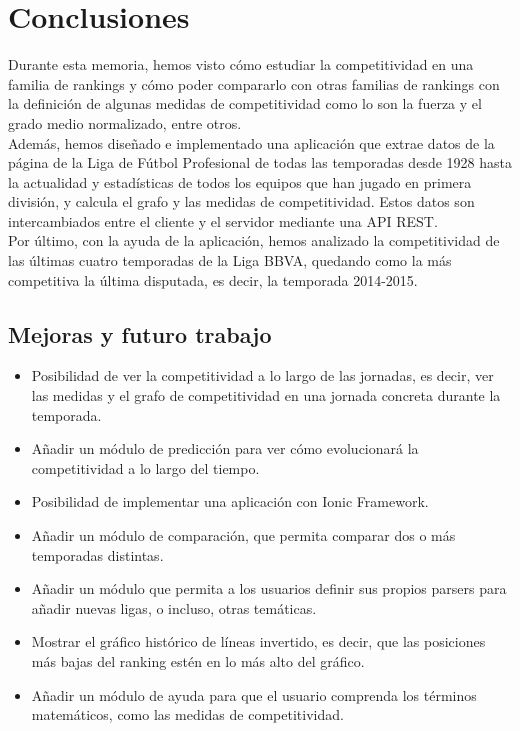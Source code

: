 \chapter{Conclusiones}

Durante esta memoria, hemos visto cómo estudiar la competitividad en una familia de rankings y cómo poder compararlo con otras familias de rankings con la definición de algunas medidas de competitividad como lo son la fuerza y el grado medio normalizado, entre otros.\\

Además, hemos diseñado e implementado una aplicación que extrae datos de la página de la Liga de Fútbol Profesional de todas las temporadas desde 1928 hasta la actualidad y estadísticas de todos los equipos que han jugado en primera división, y calcula el grafo y las medidas de competitividad. Estos datos son intercambiados entre el cliente y el servidor mediante una API REST.\\

Por último, con la ayuda de la aplicación, hemos analizado la competitividad de las últimas cuatro temporadas de la Liga BBVA, quedando como la más competitiva la última disputada, es decir, la temporada 2014-2015.

\section{Mejoras y futuro trabajo}

\begin{itemize}
\item Posibilidad de ver la competitividad a lo largo de las jornadas, es decir, ver las medidas y el grafo de competitividad en una jornada concreta durante la temporada.

\item Añadir un módulo de predicción para ver cómo evolucionará la competitividad a lo largo del tiempo.

\item Posibilidad de implementar una aplicación con Ionic Framework.

\item Añadir un módulo de comparación, que permita comparar dos o más temporadas distintas.

\item Añadir un módulo que permita a los usuarios definir sus propios parsers para añadir nuevas ligas, o incluso, otras temáticas.

\item Mostrar el gráfico histórico de líneas invertido, es decir, que las posiciones más bajas del ranking estén en lo más alto del gráfico.

\item Añadir un módulo de ayuda para que el usuario comprenda los términos matemáticos, como las medidas de competitividad.
\end{itemize}
